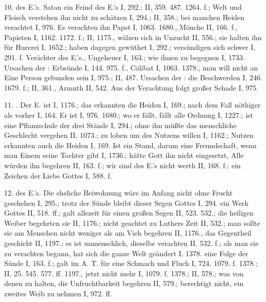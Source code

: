 10.  des E.’s. Satan ein Feind des E.’s I, 292.; II, 359. 487. 1264. f.; Welt und Fleisch verstehen ihn nicht zu schätzen I, 294.; II, 358.; bei manchen Heiden verachtet I, 976. Es verachten ihn Papst I, 1063. 1680., Mönche II, 166. f., Papisten I, 1162. 1172. f.; II, 1175., wälzen sich in Unzucht II, 556.; sie halten ihn für Hurerei I, 1652.; haben dagegen gewüthet I, 292.; versündigen sich schwer I, 291. f. Verächter des E.’s., Ungeheuer I, 163.; wie ihnen zu begegnen I, 1733. Ursachen der : Erbsünde I, 144. 975. f., Cölibat I, 1063. 1378., man will nicht an Eine Person gebunden sein I, 975.; II, 487. Ursachen der : die Beschwerden I, 246. 1679. f.; II, 361., Armuth II, 542. Aus der Verachtung folgt großer Schade I, 975.

11. . Der E. ist  I, 1176.; das erkannten die Heiden I, 169.; nach dem Fall nöthiger als vorher I, 164. Er ist  I, 976. 1680.; wo er fällt, fällt alle Ordnung I, 1227.; ist eine Pflanzschule der drei Stände I, 294.; ohne ihn müßte das menschliche Geschlecht vergehen II, 1073.; zu loben um des Nutzens willen I, 1162.; Nutzen erkannten auch die Heiden I, 169. Ist ein  Stand, darum eine Freundschaft, wenn man Einem seine Tochter gibt I, 1736.; hätte Gott ihn nicht eingesetzt, Alle würden ihn begehren II, 163. f.; wir sind des E.’s nicht werth II, 168. f.; ein Zeichen der Liebe Gottes I, 588. f.

12.  des E.’s. Die eheliche Beiwohnung wäre im Anfang nicht ohne Frucht geschehen I, 295.; trotz der Sünde bleibt dieser Segen Gottes I, 294.  ein Werk Gottes II, 518. ff.; galt allezeit für einen großen Segen II, 523. 532.; die heiligen Weiber begehrten sie II, 1176.; nicht geachtet zu Luthers Zeit II, 532.; man sollte sie am Menschen nicht weniger als am Vieh begehren II, 1176., das Gegentheil geschieht II, 1197.; es ist unmenschlich, dieselbe verachten II, 532. f.; als man sie zu verachten begann, hat sich die ganze Welt geändert I, 1378.  eine Folge der Sünde I, 163. f.; galt im A. T. für eine Schmach und Fluch I, 724. 1079. f. 1378.; II, 25. 545. 577. ff. 1197., jetzt nicht mehr I, 1079. f. 1378.; II, 578.; was von denen zu halten, die Unfruchtbarkeit begehren II, 579.; berechtigt nicht, ein zweites Weib zu nehmen I, 972. ff.

